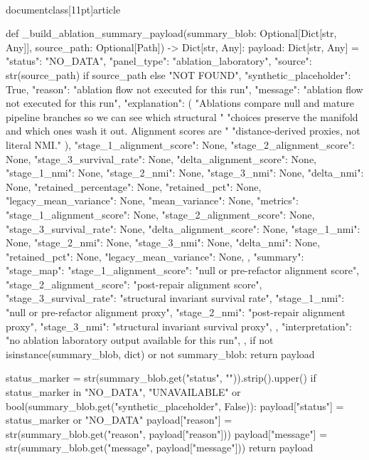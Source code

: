 \\documentclass[11pt]{article}
\begin{document}
\begin{CodeBlock}
def _build_ablation_summary_payload(summary_blob: Optional[Dict[str, Any]], source_path: Optional[Path]) -> Dict[str, Any]:
    payload: Dict[str, Any] = {
        "status": "NO_DATA",
        "panel_type": "ablation_laboratory",
        "source": str(source_path) if source_path else "NOT FOUND",
        "synthetic_placeholder": True,
        "reason": "ablation flow not executed for this run",
        "message": "ablation flow not executed for this run",
        "explanation": (
            "Ablations compare null and mature pipeline branches so we can see which structural "
            "choices preserve the manifold and which ones wash it out. Alignment scores are "
            "distance-derived proxies, not literal NMI."
        ),
        "stage_1_alignment_score": None,
        "stage_2_alignment_score": None,
        "stage_3_survival_rate": None,
        "delta_alignment_score": None,
        "stage_1_nmi": None,
        "stage_2_nmi": None,
        "stage_3_nmi": None,
        "delta_nmi": None,
        "retained_percentage": None,
        "retained_pct": None,
        "legacy_mean_variance": None,
        "mean_variance": None,
        "metrics": {
            "stage_1_alignment_score": None,
            "stage_2_alignment_score": None,
            "stage_3_survival_rate": None,
            "delta_alignment_score": None,
            "stage_1_nmi": None,
            "stage_2_nmi": None,
            "stage_3_nmi": None,
            "delta_nmi": None,
            "retained_pct": None,
            "legacy_mean_variance": None,
        },
        "summary": {
            "stage_map": {
                "stage_1_alignment_score": "null or pre-refactor alignment score",
                "stage_2_alignment_score": "post-repair alignment score",
                "stage_3_survival_rate": "structural invariant survival rate",
                "stage_1_nmi": "null or pre-refactor alignment proxy",
                "stage_2_nmi": "post-repair alignment proxy",
                "stage_3_nmi": "structural invariant survival proxy",
            },
            "interpretation": "no ablation laboratory output available for this run",
        },
    }
    if not isinstance(summary_blob, dict) or not summary_blob:
        return payload

    status_marker = str(summary_blob.get("status", "")).strip().upper()
    if status_marker in {"NO_DATA", "UNAVAILABLE"} or bool(summary_blob.get("synthetic_placeholder", False)):
        payload["status"] = status_marker or "NO_DATA"
        payload["reason"] = str(summary_blob.get("reason", payload["reason"]))
        payload["message"] = str(summary_blob.get("message", payload["message"]))
        return payload


\end{CodeBlock}
\end{document}
